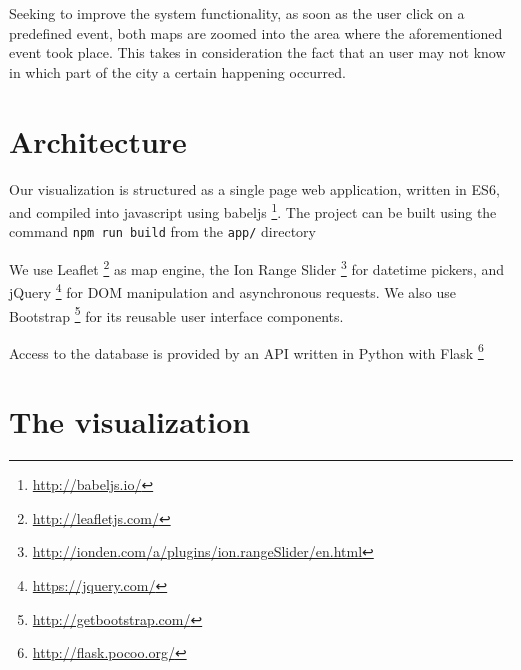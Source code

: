 \documentclass[11pt]{article}%
\begin{document}
Seeking to improve the system functionality, as soon as the user click on a predefined event, both maps are zoomed into the area where the aforementioned event took place. This takes in consideration the fact that an user may not know in which part of the city a certain happening occurred.
                       
\section{Architecture}
Our visualization is structured as a single page web application, written in ES6, and compiled into javascript using babeljs \footnote{\url{http://babeljs.io/}}. The project can be built using the command \texttt{npm run build} from the \texttt{app/} directory

We use Leaflet \footnote{\url{http://leafletjs.com/}} as map engine, the Ion Range Slider \footnote{\url{http://ionden.com/a/plugins/ion.rangeSlider/en.html}} for datetime pickers, and jQuery \footnote{\url{https://jquery.com/}} for DOM manipulation and asynchronous requests. We also use Bootstrap \footnote{\url{http://getbootstrap.com/}} for its reusable user interface components.

Access to the database is provided by an API written in Python with Flask \footnote{\url{http://flask.pocoo.org/}}

\section{The visualization}
\end{document}
